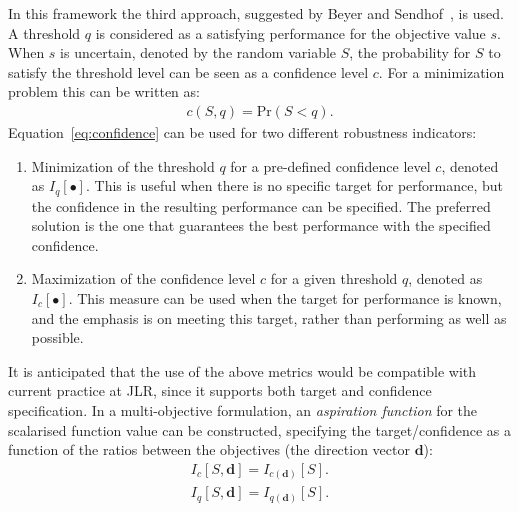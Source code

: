 \documentclass[a4paper]{article}
\newcommand{\brs}[1]{\left[{#1}\right]} %
\newcommand{\brr}[1]{{\left({#1}\right)}} %
\newcommand{\Iq}[1]{\ensuremath{I_q\!\left[{#1}\right]}} %
\newcommand{\Ic}[1]{\ensuremath{I_c\!\left[{#1}\right]}} %
\newcommand{\vd}{\ensuremath{\mathbf{d}}} %
\begin{document}
In this framework the third approach, suggested by Beyer and Sendhof~\cite{Beyer2007}, is used. A threshold $q$ is considered as a satisfying performance for the objective value $s$. When $s$ is uncertain, denoted by the random variable $S$, the probability for $S$ to satisfy the threshold level can be seen as a confidence level $c$. For a minimization problem this can be written as:
\begin{align}
\label{eq:confidence}
	c\brr{S,q}=\text{Pr}\brr{S<q}.
\end{align}
Equation~\eqref{eq:confidence} can be used for two different robustness indicators:
\begin{enumerate}
	\item Minimization of the threshold $q$ for a pre-defined confidence level $c$, denoted as $\Iq{\bullet}$.
		This is useful when there is no specific target for performance, but the confidence in the resulting performance can be specified.
		The preferred solution is the one that guarantees the best performance with the specified confidence.
	\item Maximization of the confidence level $c$ for a given threshold $q$, denoted as $\Ic{\bullet}$.
		This measure can be used when the target for performance is known, and the emphasis is on meeting this target, rather than performing as well as possible.
\end{enumerate}

It is anticipated that the use of the above metrics would be compatible with current practice at JLR, since it supports both target and confidence specification. In a multi-objective formulation, an \emph{aspiration function} for the scalarised function value can be constructed, specifying the target/confidence as a function of the ratios between the objectives (the direction vector \vd):
\begin{align}
	\Ic{S,\vd} = I_{c\brr{\vd}}\brs{S}.\\
	\Iq{S,\vd} = I_{q\brr{\vd}}\brs{S}.
\end{align}
\end{document}
